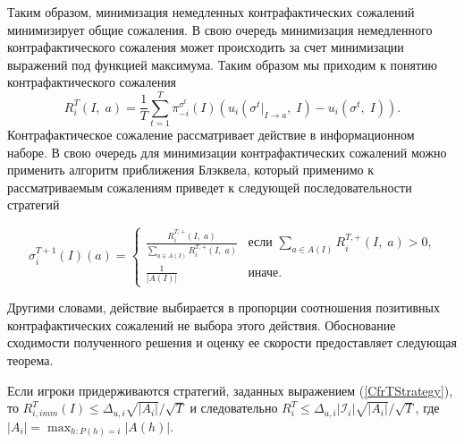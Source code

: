 Таким образом, минимизация немедленных контрафактических сожалений минимизирует общие сожаления. В свою очередь минимизация немедленного контрафактического сожаления может происходить за счет минимизации выражений под функцией максимума. Таким образом мы приходим к понятию контрафактического сожаления 
\begin{equation}
	R_i^T(I,\; a) = \frac{1}{T}\sum_{t=1}^{T}\pi_{-i}^{\sigma^t}(I)(u_i(\sigma^t |_{I \to a},\;I)-u_i(\sigma^t,\;I)).
\end{equation}
Контрафактическое сожаление рассматривает действие в информационном наборе. В свою очередь для минимизации контрафактических сожалений можно применить алгоритм приближения Блэквела, который применимо к рассматриваемым сожалениям приведет к следующей последовательности стратегий 

\begin{equation}\label{CfrTStrategy}
	\sigma_i^{T+1}(I)(a)= 
	\begin{cases}
		\frac{R_i^{T,+}(I,\;a)}{\sum_{a\in A(I)}R_i^{T,+}(I,\;a)} &\text{если $\sum_{a\in A(I)}R_i^{T,+}(I,\;a) > 0$,}\\
		\frac{1}{|A(I)|} &\text{иначе.}
	\end{cases}
\end{equation}

Другими словами, действие выбирается в пропорции соотношения позитивных контрафактических сожалений не выбора этого действия. Обоснование сходимости полученного решения и оценку ее скорости предоставляет следующая теорема. 

\begin{theo}
	Если игроки придерживаются стратегий, заданных выражением (\ref{CfrTStrategy}), то $R_{i,imm}^T(I) \leq \Delta_{u,i}\sqrt{|A_i|}/\sqrt{T}$ и следовательно $R_i^T \leq \Delta_{u,i}|\mathcal{I}_i|\sqrt{|A_i|}/\sqrt{T}$, где $|A_i|=\max_{h\colon P(h)=i}|A(h)|$.
\end{theo}
